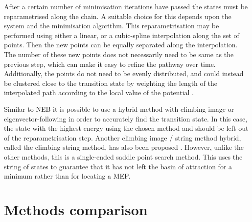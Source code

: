 After a certain number of minimisation iterations have passed the states must be reparametrised along the chain.
A suitable choice for this depends upon the system and the minimisation algorithm.
This reparametrisation may be performed using either a linear, or a cubic-spline interpolation along the set of points.
Then the new points can be equally separated along the interpolation.
The number of these new points does not necessarily need to be same as the previous step, which can make it easy to refine the pathway over time.
Additionally, the points do not need to be evenly distributed, and could instead be clustered close to the transition state by weighting the length of the interpolated path according to the local value of the potential \cite{E2007}.

Similar to NEB it is possible to use a hybrid method with climbing image \cite{E2007} or eigenvector-following in order to accurately find the transition state.
In this case, the state with the highest energy using the chosen method and should be left out of the reparametrisation step.
Another climbing image / string method hybrid, called the climbing string method, has also been proposed \cite{Ren2013}.
However, unlike the other methods, this is a single-ended saddle point search method.
This uses the string of states to guarantee that it has not left the basin of attraction for a minimum rather than for locating a MEP.


\section{Methods comparison}
